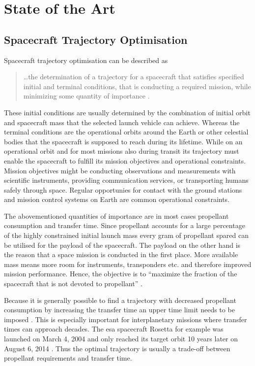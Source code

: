 \chapter{State of the Art}
\label{sec:state-of-the-art}

\section{Spacecraft Trajectory Optimisation}
\label{sec:spacecraft-trajectory-optimisation}
Spacecraft trajectory optimisation can be described as
\begin{quote}
    \ldots the determination of a trajectory for a spacecraft that satisfies specified initial and terminal conditions, that is conducting a required mission, while minimizing some quantity of importance \autocite[p. 1]{conway_problem_2014}.
\end{quote}

These initial conditions are usually determined by the combination of initial orbit and spacecraft mass that the selected launch vehicle can achieve.
Whereas the terminal conditions are the operational orbits around the Earth or other celestial bodies that the spacecraft is supposed to reach during its lifetime.
While on an operational orbit and for most missions also during transit its trajectory must enable the spacecraft to fulfill its mission objectives and operational constraints.
Mission objectives might be conducting observations and measurements with scientific instruments, providing communication services, or transporting humans safely through space.
Regular opportunies for contact with the ground stations and mission control systems on Earth are common operational constraints.

The abovementioned quantities of importance are in most cases propellant consumption and transfer time.
Since propellant accounts for a large percentage of the highly constrained initial launch mass every gram of propellant spared can be utilised for the payload of the spacecraft.
The payload on the other hand is the reason that a space mission is conducted in the first place.
More available mass means more room for instruments, transponders etc. and therefore improved mission performance.
Hence, the objective is to \enquote{maximize the fraction of the spacecraft that is not devoted to propellant} \autocite[p. 1]{conway_problem_2014}.

Because it is generally possible to find a trajectory with decreased propellant consumption by increasing the transfer time an upper time limit needs to be imposed \autocite[p. 1]{conway_problem_2014}.
This is especially important for interplanetary missions where transfer times can approach decades.
The \ac{esa} spacecraft Rosetta for example was launched on March 4, 2004 and only reached its target orbit 10 years later on August 6, 2014 \autocite{glassmeier_rosetta_2007}.
Thus the optimal trajectory is usually a trade-off between propellant requirements and transfer time.

